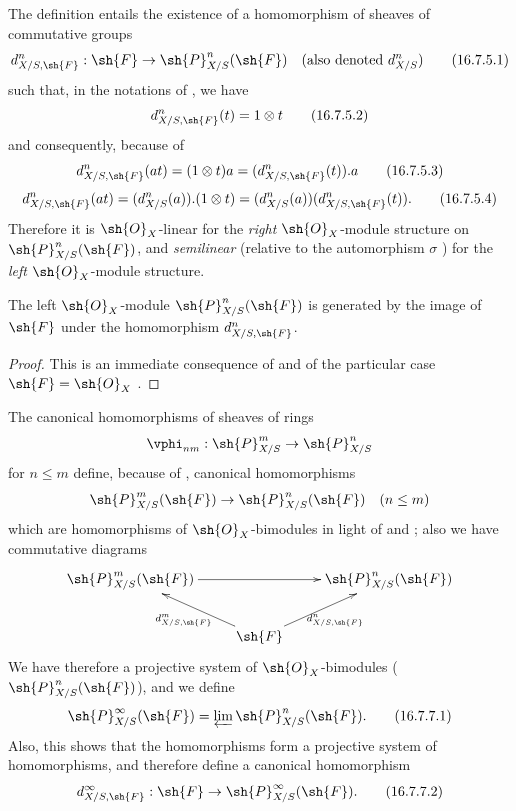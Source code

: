 \begin{env}[16.7.5]
\label{IV.16.7.5}
The definition  entails the existence of a homomorphism of sheaves of commutative groups
\[
  \label{IV.16.7.5.1}
  d_{X/S, \sh{F}}^n: \sh{F} \to \sh{P}_{X/S}^n(\sh{F}) \quad (\text{also denoted } d_{X/S}^n)
  \tag{16.7.5.1}
\]
such that, in the notations of , we have
\[
  \label{IV.16.7.5.2}
  d_{X/S, \sh{F}}^n(t) = 1 \otimes t
  \tag{16.7.5.2}
\]
and consequently, because of 
\[
  \label{IV.16.7.5.3}
  d_{X/S, \sh{F}}^n(at) = (1 \otimes t) a = (d_{X/S, \sh{F}}^n(t)).a
  \tag{16.7.5.3}
\]
\[
  \label{IV.16.7.5.4}
  d_{X/S, \sh{F}}^n(at) = (d_{X/S}^n(a)).(1 \otimes t) = (d_{X/S}^n(a))(d_{X/S, \sh{F}}^n(t)).
  \tag{16.7.5.4}
\]
Therefore it is $\sh{O}_X$-linear for the \emph{right} $\sh{O}_X$-module structure on $\sh{P}_{X/S}^n(\sh{F})$, and \emph{semilinear} (relative to the automorphism $\sigma$ ) for the \emph{left} $\sh{O}_X$-module structure.
\end{env}

\begin{proposition}[16.7.6]
\label{IV.16.7.6}
The left $\sh{O}_X$-module $\sh{P}_{X/S}^n(\sh{F})$ is generated by the image of $\sh{F}$ under the homomorphism $d_{X/S, \sh{F}}^n$.
\end{proposition}

\begin{proof}
This is an immediate consequence of  and of the particular case $\sh{F} = \sh{O}_X$ .
\end{proof}

\begin{env}[16.7.7]
\label{IV.16.7.7}
The canonical homomorphisms of sheaves of rings
\[
  \vphi_{nm}:\sh{P}_{X/S}^m \to \sh{P}_{X/S}^n 
\]
for $n \leq m$  define, because of , canonical homomorphisms 
\[
  \sh{P}_{X/S}^m(\sh{F}) \to \sh{P}_{X/S}^n(\sh{F}) \quad (n \leq m)
\]
which are homomorphisms of $\sh{O}_X$-bimodules in light of  and ;
also we have commutative diagrams
\[
  \xymatrix{
    \sh{P}_{X/S}^m(\sh{F}) \ar[rr] && \sh{P}_{X/S}^n(\sh{F}) \\
      & \sh{F} \ar[ul]^-{d_{X/S,\sh{F}}^m} \ar[ur]_-{d_{X/S,\sh{F}}^n}
  }
\]
We have therefore a projective system of $\sh{O}_X$-bimodules ($\sh{P}_{X/S}^n(\sh{F})$), and we define
\[
  \label{IV.16.7.7.1}
  \sh{P}_{X/S}^\infty(\sh{F}) = \varprojlim \sh{P}_{X/S}^n(\sh{F}).
  \tag{16.7.7.1}
\]
Also, this shows that the homomorphisms  form a projective system of homomorphisms, and therefore define a canonical homomorphism
\[
  \label{IV.16.7.7.2}
  d_{X/S,\sh{F}}^\infty: \sh{F} \to \sh{P}_{X/S}^\infty(\sh{F}).
  \tag{16.7.7.2}
\]
\end{env}

